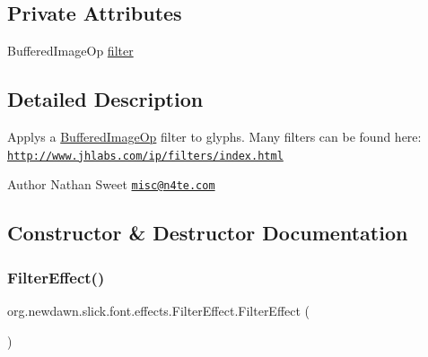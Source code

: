 \subsection*{Private Attributes}
\begin{DoxyCompactItemize}
\item 
Buffered\+Image\+Op \mbox{\hyperlink{classorg_1_1newdawn_1_1slick_1_1font_1_1effects_1_1_filter_effect_aafe0a98e55b983f1b26e5ed235d254be}{filter}}
\end{DoxyCompactItemize}


\subsection{Detailed Description}
Applys a \mbox{\hyperlink{}{Buffered\+Image\+Op}} filter to glyphs. Many filters can be found here\+: \href{http://www.jhlabs.com/ip/filters/index.html}{\tt http\+://www.\+jhlabs.\+com/ip/filters/index.\+html}

\begin{DoxyAuthor}{Author}
Nathan Sweet \href{mailto:misc@n4te.com}{\tt misc@n4te.\+com} 
\end{DoxyAuthor}


\subsection{Constructor \& Destructor Documentation}
\mbox{\label{classorg_1_1newdawn_1_1slick_1_1font_1_1effects_1_1_filter_effect_a77ad8caac410c7adf82ebf8012f2b3dd}} 
\subsubsection{\texorpdfstring{Filter\+Effect()}{FilterEffect()}\hspace{0.1cm}{\footnotesize\ttfamily [1/2]}}
{\footnotesize\ttfamily org.\+newdawn.\+slick.\+font.\+effects.\+Filter\+Effect.\+Filter\+Effect (\begin{DoxyParamCaption}{ }\end{DoxyParamCaption})\hspace{0.3cm}{\ttfamily [inline]}}

